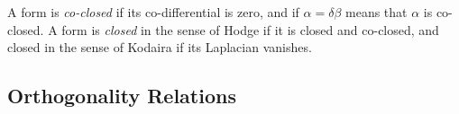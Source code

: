 \begin{defn}

A form is \textit{co-closed} if its co-differential is zero, and if $ \alpha = \delta \beta$ means that $ \alpha$ is co-closed. A form is \textit{closed} in the sense of Hodge if it is closed and co-closed, and closed in the sense of Kodaira if its Laplacian vanishes.

\end{defn}

\subsection{Orthogonality Relations}































